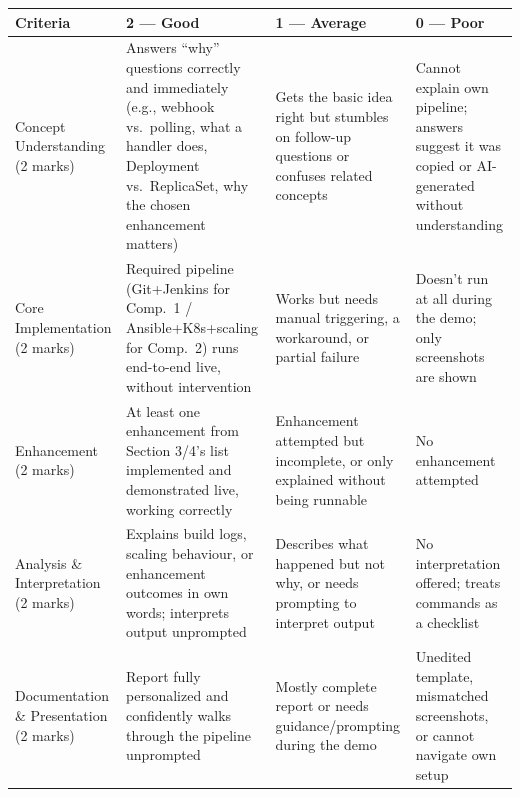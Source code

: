 \documentclass[12pt,a4paper]{article}
\newcommand{\sizeTwelve}{\fontsize{12pt}{14.5pt}\selectfont}  %
\begin{document}
\vspace{0.4cm}

{\sizeTwelve
\setlength{\tabcolsep}{4pt}
\renewcommand{\arraystretch}{1.25}
\begin{longtable}{|>{\raggedright\arraybackslash}p{3.0cm}|>{\raggedright\arraybackslash}p{3.5cm}|>{\raggedright\arraybackslash}p{3.5cm}|>{\raggedright\arraybackslash}p{3.5cm}|}
\hline

\textbf{Criteria} & \textbf{2 --- Good} & \textbf{1 --- Average} & \textbf{0 --- Poor} \\

\hline
\endhead
Concept Understanding (2 marks) & Answers ``why'' questions correctly and immediately (e.g., webhook vs.\ polling, what a handler does, Deployment vs.\ ReplicaSet, why the chosen enhancement matters) & Gets the basic idea right but stumbles on follow-up questions or confuses related concepts & Cannot explain own pipeline; answers suggest it was copied or AI-generated without understanding \\
\hline
Core Implementation (2 marks) & Required pipeline (Git+Jenkins for Comp.\ 1 / Ansible+K8s+scaling for Comp.\ 2) runs end-to-end live, without intervention & Works but needs manual triggering, a workaround, or partial failure & Doesn't run at all during the demo; only screenshots are shown \\
\hline
Enhancement (2 marks) & At least one enhancement from Section 3/4's list implemented and demonstrated live, working correctly & Enhancement attempted but incomplete, or only explained without being runnable & No enhancement attempted \\
\hline
Analysis \& Interpretation (2 marks) & Explains build logs, scaling behaviour, or enhancement outcomes in own words; interprets output unprompted & Describes what happened but not why, or needs prompting to interpret output & No interpretation offered; treats commands as a checklist \\
\hline
Documentation \& Presentation (2 marks) & Report fully personalized  and confidently walks through the pipeline unprompted & Mostly complete report or needs guidance/prompting during the demo & Unedited template, mismatched screenshots, or cannot navigate own setup \\
\hline
\end{longtable}
\par}

\newpage

\end{document}
